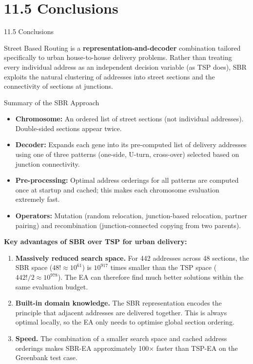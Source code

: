 \documentclass[aspectratio=169,10pt]{beamer}
\begin{document}
\section{11.5 Conclusions}

\begin{frame}[allowframebreaks]{11.5 Conclusions}

  Street Based Routing is a \textbf{representation-and-decoder} combination
  tailored specifically to urban house-to-house delivery problems.  Rather
  than treating every individual address as an independent decision variable
  (as TSP does), SBR exploits the natural clustering of addresses into street
  sections and the connectivity of sections at junctions.

  \begin{block}{Summary of the SBR Approach}
    \begin{itemize}
      \item \textbf{Chromosome:} An ordered list of street sections (not
            individual addresses).  Double-sided sections appear twice.
      \item \textbf{Decoder:} Expands each gene into its pre-computed list
            of delivery addresses using one of three patterns (one-side,
            U-turn, cross-over) selected based on junction connectivity.
      \item \textbf{Pre-processing:} Optimal address orderings for all
            patterns are computed once at startup and cached; this makes
            each chromosome evaluation extremely fast.
      \item \textbf{Operators:} Mutation (random relocation, junction-based
            relocation, partner pairing) and recombination (junction-connected
            copying from two parents).
    \end{itemize}
  \end{block}

  \framebreak

  \textbf{Key advantages of SBR over TSP for urban delivery:}

  \begin{enumerate}
    \item \textbf{Massively reduced search space.}  For 442 addresses across
          48 sections, the SBR space ($48! \approx 10^{61}$) is $10^{917}$
          times smaller than the TSP space ($442!/2 \approx 10^{978}$).  The
          EA can therefore find much better solutions within the same
          evaluation budget.
    \item \textbf{Built-in domain knowledge.}  The SBR representation encodes
          the principle that adjacent addresses are delivered together.  This
          is always optimal locally, so the EA only needs to optimise global
          section ordering.
    \item \textbf{Speed.}  The combination of a smaller search space and
          cached address orderings makes SBR-EA approximately 100$\times$
          faster than TSP-EA on the Greenbank test case.
  \end{enumerate}


\end{frame}
\end{document}
